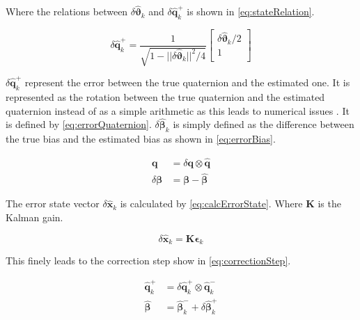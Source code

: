 Where the relations between $\delta\hat{\boldsymbol{\vartheta}}_k$ and $\delta\hat{\boldsymbol{q}}^+_k$ is shown in \autoref{eq:stateRelation}.

\begin{equation}\label{eq:stateRelation}
	\delta\hat{\boldsymbol{q}}^+_k = \frac{1}{\sqrt{1- ||\delta\hat{\boldsymbol{\vartheta}}_k||^2/4}}\begin{bmatrix}
			\delta\hat{\boldsymbol{\vartheta}}_k/2 \\
			1 \\
		\end{bmatrix}
\end{equation}

$\delta\hat{\boldsymbol{q}}^+_k$ represent the error between the true quaternion and the estimated one. It is represented as the rotation between the true quaternion and the estimated quaternion instead of as a simple arithmetic as this leads to numerical issues \cite{DavidThesis}. It is defined by \autoref{eq:errorQuaternion}. $\delta\hat{\boldsymbol{\beta}}_k$ is simply defined as the difference between the true bias and the estimated bias as shown in \autoref{eq:errorBias}.

\begin{subequations}
\begin{align}
	\boldsymbol{q} &= \delta\boldsymbol{q}\otimes\hat{\boldsymbol{q}}\label{eq:errorQuaternion} \\
	\delta\boldsymbol{\beta} &= \boldsymbol{\beta} - \hat{\boldsymbol{\beta}}\label{eq:errorBias} 
\end{align}
\end{subequations} 

The error state vector $\delta\hat{\boldsymbol{x}}_k$ is calculated by \autoref{eq:calcErrorState}. Where $\boldsymbol{K}$ is the Kalman gain. 

\begin{equation}\label{eq:calcErrorState}
	\delta\hat{\boldsymbol{x}}_k = \boldsymbol{K}\boldsymbol{\epsilon}_k
\end{equation}

This finely leads to the correction step show in \autoref{eq:correctionStep}. 

\begin{subequations}\label{eq:correctionStep}
\begin{align}
	\hat{\boldsymbol{q}}^+_k &= \delta\hat{\boldsymbol{q}}^+_k\otimes\hat{\boldsymbol{q}}^-_k \\
	\hat{\boldsymbol{\beta}} &= \hat{\boldsymbol{\beta}}^-_k + \delta\hat{\boldsymbol{\beta}}^+_k 
\end{align}
\end{subequations} 

